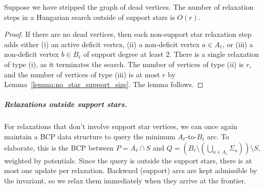 \documentclass[a4paper,UKenglish]{socg-lipics-v2018}
\def\polylog{\mathop{\mathrm{polylog}}}
\theoremstyle{plain}
\numberwithin{figure}{section}
\renewcommand{\paragraph}{\subparagraph}
\begin{document}
\begin{lemmarep}
\label{lemma:orlin_relax_count}
Suppose we have stripped the graph of dead vertices.
The number of relaxation steps in a Hungarian search outside of support stars
is $O(r)$.
\end{lemmarep}

\begin{proof}
If there are no dead vertices, then each non-support star relaxation step adds
either
(i) an active deficit vertex,
(ii) a non-deficit vertex $a \in A_\ell$, or
(iii) a non-deficit vertex $b \in B_\ell$ of support degree at least 2.
There is a single relaxation of type (i), as it terminates the search.
The number of vertices of type (ii) is $r$, and the number of vertices of type
(iii) is at most $r$ by Lemma~\ref{lemma:no_star_support_size}.
The lemma follows.
\end{proof}


\paragraph{Relaxations outside support stars.}
For relaxations that don't involve support star vertices, we can once again
maintain a BCP data structure to query the minimum $A_\ell$-to-$B_\ell$ arc.
To elaborate, this is the BCP between $P = A_\ell \cap S$ and
$Q = (B_\ell \setminus (\bigcup_{a \in A_\ell} \Sigma_a)) \setminus S$,
weighted by potentials.
Since the query is outside the support stars, there is at most one update per relaxation.
%
Backward (support) arcs are kept admissible by the invariant, so we relax them immediately when they arrive at the frontier.
\end{document}
